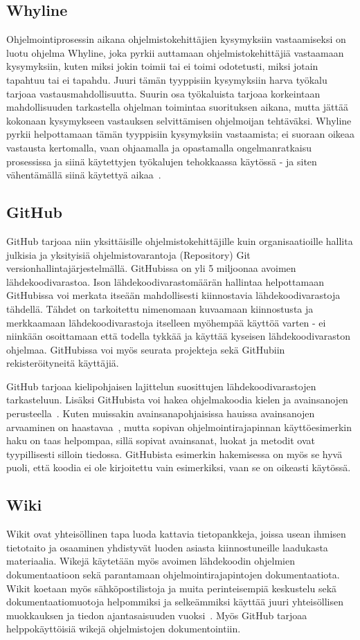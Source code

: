 \documentclass[finnish]{../tktltiki2}
\theoremstyle{definition}
\theoremstyle{remark}
\begin{document}
\subsection{Whyline}
Ohjelmointiprosessin aikana ohjelmistokehittäjien kysymyksiin vastaamiseksi on luotu ohjelma Whyline, joka pyrkii auttamaan ohjelmistokehittäjiä vastaamaan kysymyksiin, kuten miksi jokin toimii tai ei toimi odotetusti, miksi jotain tapahtuu tai ei tapahdu. Juuri tämän tyyppisiin kysymyksiin harva työkalu tarjoaa vastausmahdollisuutta. Suurin osa työkaluista tarjoaa korkeintaan mahdollisuuden tarkastella ohjelman toimintaa suorituksen aikana, mutta jättää kokonaan kysymykseen vastauksen selvittämisen ohjelmoijan tehtäväksi.
Whyline pyrkii helpottamaan tämän tyyppisiin kysymyksiin vastaamista; ei suoraan oikeaa vastausta kertomalla, vaan ohjaamalla ja opastamalla ongelmanratkaisu prosessissa ja siinä käytettyjen työkalujen tehokkaassa käytössä - ja siten vähentämällä siinä käytettyä aikaa~\cite{whyline}.
\subsection{GitHub}
GitHub tarjoaa niin yksittäisille ohjelmistokehittäjille kuin organisaatioille hallita julkisia ja yksityisiä ohjelmistovarantoja (Repository) Git versionhallintajärjestelmällä. GitHubissa on yli 5 miljoonaa avoimen lähdekoodivarastoa. Ison lähdekoodivarastomäärän hallintaa helpottamaan GitHubissa voi merkata itseään mahdollisesti kiinnostavia lähdekoodivarastoja tähdellä. Tähdet on tarkoitettu nimenomaan kuvaamaan kiinnostusta ja merkkaamaan lähdekoodivarastoja itselleen myöhempää käyttöä varten - ei niinkään osoittamaan että todella tykkää ja käyttää kyseisen lähdekoodivaraston ohjelmaa\cite{social-networking-meets-se}.
GitHubissa voi myös seurata projekteja sekä GitHubiin rekisteröityneitä käyttäjiä.

GitHub tarjoaa kielipohjaisen lajittelun suosittujen lähdekoodivarastojen tarkasteluun. Lisäksi GitHubista voi hakea ohjelmakoodia kielen ja avainsanojen perusteella~\cite{social-networking-meets-se}. Kuten muissakin avainsanapohjaisissa hauissa avainsanojen arvaaminen on haastavaa~\cite{what-to-search-for}, mutta sopivan ohjelmointirajapinnan käyttöesimerkin haku on taas helpompaa, sillä sopivat avainsanat, luokat ja metodit ovat tyypillisesti silloin tiedossa. GitHubista esimerkin hakemisessa on myös se hyvä puoli, että koodia ei ole kirjoitettu vain esimerkiksi, vaan se on oikeasti käytössä.
\subsection{Wiki}
Wikit ovat yhteisöllinen tapa luoda kattavia tietopankkeja, joissa usean ihmisen tietotaito ja osaaminen yhdistyvät luoden asiasta kiinnostuneille laadukasta materiaalia. Wikejä käytetään myös avoimen lähdekoodin ohjelmien dokumentaatioon sekä parantamaan ohjelmointirajapintojen dokumentaatiota. Wikit koetaan myös sähköpostilistoja ja muita perinteisempiä keskustelu sekä dokumentaatiomuotoja helpommiksi ja selkeämmiksi käyttää juuri yhteisöllisen muokkauksen ja tiedon ajantasaisuuden vuoksi~\cite{using-wikis-in-sw}.
Myös GitHub tarjoaa helppokäyttöisiä wikejä ohjelmistojen dokumentointiin. \cite{github-wiki}
\end{document}
